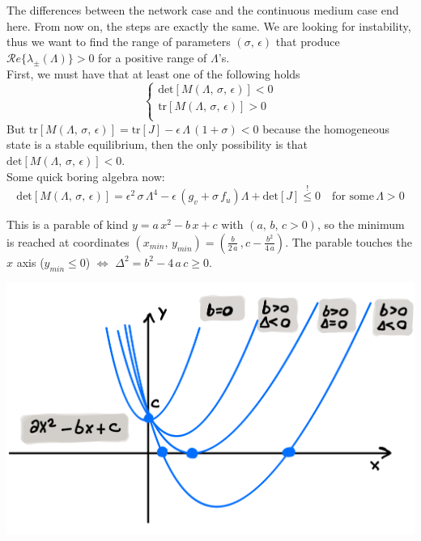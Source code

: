 The differences between the network case and the continuous medium case end here. From now on, the steps are exactly the same. We are looking for instability, thus we want to find the range of parameters $(\sigma,\, \epsilon)$ that produce $\mathcal{R}e\{\lambda_{\pm}(\Lambda)\}>0$ for a positive range of $\Lambda$'s. \\
First, we must have that at least one of the following holds
\begin{equation*}
    \begin{cases}
        \text{det}[M(\Lambda,\,\sigma,\,\epsilon)]<0 \\
        \text{tr}[M(\Lambda,\,\sigma,\,\epsilon)]> 0 \\
    \end{cases}
\end{equation*}
But $\text{tr}[M(\Lambda,\,\sigma,\,\epsilon)] = \text{tr}[J] - \epsilon\, \Lambda\, (1+\sigma)<0$ because the homogeneous state is a stable equilibrium, then the only possibility is that $\text{det}[M(\Lambda,\,\sigma,\,\epsilon)]< 0$. \\
Some quick boring algebra now:
\begin{equation*}
    \text{det}[M(\Lambda,\,\sigma,\,\epsilon)] = \epsilon^2\,\sigma\,\Lambda^4 - \epsilon\,(g_v +\sigma\,f_u) \Lambda + \text{det}[J] \overset{!}{\leq} 0 \quad \text{for some}\, \Lambda >0
\end{equation*}
\begin{minipage}{0.6\textwidth}
This is a parable of kind $y = a\,x^2 - b\,x + c$ with  $(a,\,b,\,c>0)$, so the minimum is reached at coordinates $(x_{min},\,y_{min}) = (\frac{b}{2\,a}\,, c-\frac{b^2}{4\,a})$. The parable touches the $x$ axis ($y_{min}\leq 0$) $\iff$ $\Delta^2 = b^2-4\,a\,c \geq 0$.
\end{minipage}
\hfill
\begin{minipage}{0.38\textwidth}
    \centering
    \includegraphics[width=\textwidth]{latex_source/images/turing/parable.jpeg}
\end{minipage}
